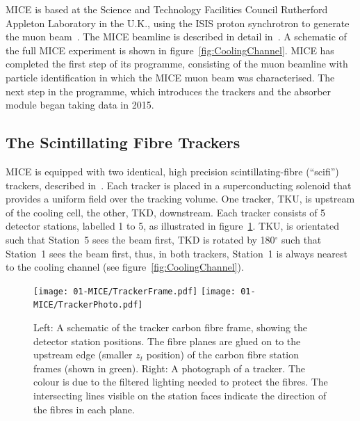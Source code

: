   MICE is based at the Science and Technology Facilities Council Rutherford Appleton Laboratory in the U.K., using the ISIS proton synchrotron to generate the muon beam~\cite{MiceTarget}.  The MICE beamline is described in detail in~\cite{MiceBeamline}. A schematic of the full MICE experiment is shown in figure~\ref{fig:CoolingChannel}.  MICE has completed the first step of its programme, consisting of the muon beamline with particle identification in which the MICE muon beam was characterised. The next step in the programme, which introduces the trackers and the absorber module began taking data in 2015. %


  \subsection{The Scintillating Fibre Trackers}
  \label{subsec:Trackers}
  MICE is equipped with two identical, high precision scintillating-fibre (``scifi'') trackers, described in~\cite{MiceTrackers}. Each tracker is placed in a superconducting solenoid that provides a uniform field over the tracking volume. One tracker, TKU, is upstream of the cooling cell, the other, TKD, downstream.  Each tracker consists of 5 detector stations, labelled 1 to 5, as illustrated in figure~\ref{fig:Trackers}. TKU, is orientated such that Station~5 sees the beam first, TKD is rotated by 180$^\circ$ such that Station~1 sees the beam first, thus, in both trackers, Station~1 is always nearest to the cooling channel (see figure~\ref{fig:CoolingChannel}).
  
  \begin{figure}[tbh]
    \centering
    \texttt{[image: 01-MICE/TrackerFrame.pdf]} \hspace{2pc}%
    \texttt{[image: 01-MICE/TrackerPhoto.pdf]}
    \caption{\label{fig:Trackers} Left: A schematic of the tracker carbon fibre frame, showing the detector station positions.  The fibre planes are glued on to the upstream edge (smaller $z_t$ position) of the carbon fibre station frames (shown in green). Right: A photograph of a tracker. The colour is due to the filtered lighting needed to protect the fibres. The intersecting lines visible on the station faces indicate the direction of the fibres in each plane.}
  \end{figure}

